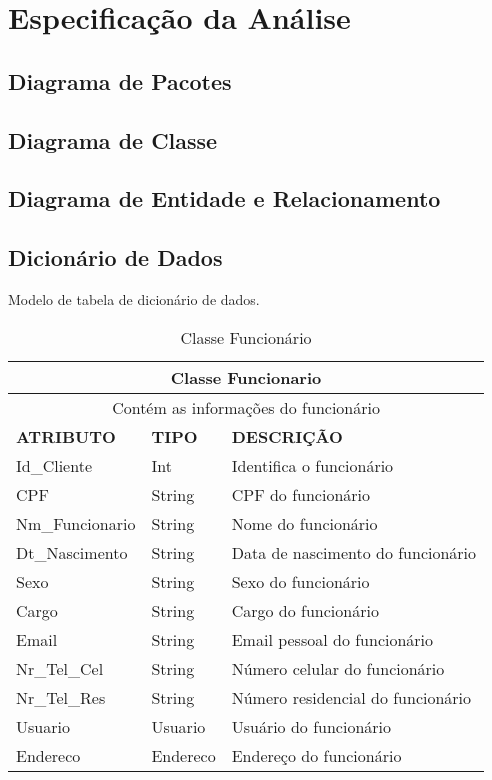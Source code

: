 \section{Especificação da Análise}
\subsection{Diagrama de Pacotes}

\subsection{Diagrama de Classe}

\subsection{Diagrama de Entidade e Relacionamento}

\subsection{Dicionário de Dados}

Modelo de tabela de dicionário de dados.

\begin{table}[htp!]
\caption{Classe Funcionário}
\centering
\begin{tabularx}{\textwidth}{|X|X|X|}
\hline
\multicolumn{3}{|c|}{\textbf{Classe Funcionario}} \\
 \hline 
 \multicolumn{3}{|c|}{Contém as informações do funcionário} \\
 \hline
 \textbf{ATRIBUTO} & \textbf{TIPO} & \textbf{DESCRIÇÃO} \\
 \hline
 Id\_Cliente & Int & Identifica o funcionário \\
 \hline
 CPF & String & CPF do funcionário \\
 \hline
 Nm\_Funcionario & String & Nome do funcionário \\
 \hline
 Dt\_Nascimento & String & Data de nascimento do funcionário \\
 \hline
 Sexo & String & Sexo do funcionário \\
 \hline
 Cargo & String & Cargo do funcionário \\
 \hline
 Email & String & Email pessoal do funcionário \\
 \hline
 Nr\_Tel\_Cel & String & Número celular do funcionário \\
 \hline
 Nr\_Tel\_Res & String & Número residencial do funcionário \\
 \hline
 Usuario & Usuario & Usuário do funcionário \\
 \hline
 Endereco & Endereco & Endereço do funcionário \\
\hline
\end{tabularx}{}
\end{table}

